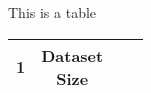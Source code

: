 \documentclass[a4paper,10pt]{report}
\begin{document}
This is a table

\begin{tabular}{c c c c}
  \hline
  1 & \makecell{Dataset\\Size}\\
  \hline
\end{tabular}
\end{document}
